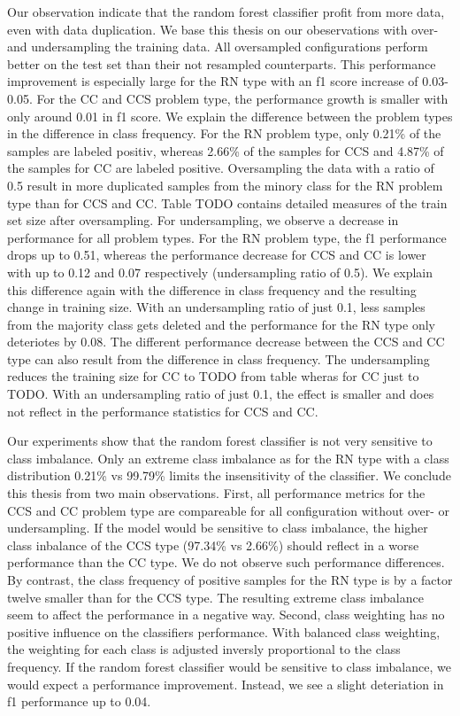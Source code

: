 Our observation indicate that the random forest classifier profit from more data, even with data duplication. We base this thesis on our obeservations with over- and undersampling the training data. All oversampled configurations perform better on the test set than their not resampled counterparts. This performance improvement is especially large for the RN type with an f1 score increase of 0.03-0.05. For the CC and CCS problem type, the performance growth is smaller with only around 0.01 in f1 score. We explain the difference between the problem types in the difference in class frequency. For the RN problem type, only 0.21\% of the samples are labeled positiv, whereas 2.66\% of the samples for CCS and 4.87\% of the samples for CC are labeled positive. Oversampling the data with a ratio of 0.5 result in more duplicated samples from the minory class for the RN problem type than for CCS and CC. Table TODO contains detailed measures of the train set size after oversampling.
For undersampling, we observe a decrease in performance for all problem types. For the RN problem type, the f1 performance drops up to 0.51, whereas the performance decrease for CCS and CC is lower with up to 0.12 and 0.07 respectively (undersampling ratio of 0.5). We explain this difference again with the difference in class frequency and the resulting change in training size. With an undersampling ratio of just 0.1, less samples from the majority class gets deleted and the performance for the RN type only deteriotes by 0.08.
The different performance decrease between the CCS and CC type can also result from the difference in class frequency. The undersampling reduces the training size for CC to TODO from table wheras for CC just to TODO. With an undersampling ratio of just 0.1, the effect is smaller and does not reflect in the performance statistics for CCS and CC.



Our experiments show that the random forest classifier is not very sensitive to class imbalance. Only an extreme class imbalance as for  the RN type with a class distribution 0.21\% vs 99.79\% limits the insensitivity of the classifier. We conclude this thesis from two main observations. 
First, all performance metrics for the CCS and CC problem type are compareable for all configuration without over- or undersampling. If the model would be sensitive to class imbalance, the higher class inbalance of the CCS type (97.34\% vs 2.66\%) should reflect in a worse performance than the CC type. We do not observe such performance differences. By contrast, the class frequency of positive samples for the RN type is by a factor twelve smaller than for the CCS type. The resulting extreme class imbalance seem to affect the performance in a negative way. 
Second, class weighting has no positive influence on the classifiers performance. With balanced class weighting, the weighting for each class is adjusted inversly proportional to the class frequency. If the random forest classifier would be sensitive to class imbalance, we would expect a performance improvement. Instead, we see a slight deteriation in f1 performance up to 0.04.


